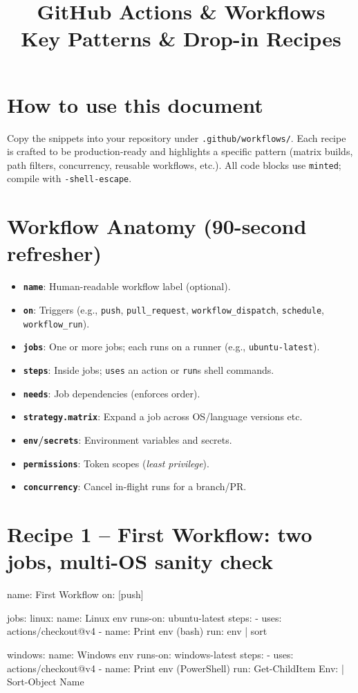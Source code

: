 \documentclass[11pt]{article}
\title{\textbf{GitHub Actions \& Workflows}\\Key Patterns \& Drop-in Recipes}
\author{}
\date{}
\begin{document}
\maketitle

\section*{How to use this document}
Copy the snippets into your repository under \texttt{.github/workflows/}. Each recipe is crafted to be production-ready and highlights a specific pattern (matrix builds, path filters, concurrency, reusable workflows, etc.). All code blocks use \texttt{minted}; compile with \texttt{-shell-escape}.

\section{Workflow Anatomy (90-second refresher)}
\begin{itemize}
  \item \textbf{\texttt{name}}: Human-readable workflow label (optional).
  \item \textbf{\texttt{on}}: Triggers (e.g., \texttt{push}, \texttt{pull\_request}, \texttt{workflow\_dispatch}, \texttt{schedule}, \texttt{workflow\_run}).
  \item \textbf{\texttt{jobs}}: One or more jobs; each runs on a runner (e.g., \texttt{ubuntu-latest}).
  \item \textbf{\texttt{steps}}: Inside jobs; \texttt{uses} an action or \texttt{run}s shell commands.
  \item \textbf{\texttt{needs}}: Job dependencies (enforces order).
  \item \textbf{\texttt{strategy.matrix}}: Expand a job across OS/language versions etc.
  \item \textbf{\texttt{env}/\texttt{secrets}}: Environment variables and secrets.
  \item \textbf{\texttt{permissions}}: Token scopes (\emph{least privilege}).
  \item \textbf{\texttt{concurrency}}: Cancel in-flight runs for a branch/PR.
\end{itemize}

\newpage
\section{Recipe 1 – First Workflow: two jobs, multi-OS sanity check}
\begin{listing}[H]
\caption{Basic two-job workflow to verify runners, shells, and checkout}
\begin{yamlcode}
name: First Workflow
on: [push]

jobs:
  linux:
    name: Linux env
    runs-on: ubuntu-latest
    steps:
      - uses: actions/checkout@v4
      - name: Print env (bash)
        run: env | sort

  windows:
    name: Windows env
    runs-on: windows-latest
    steps:
      - uses: actions/checkout@v4
      - name: Print env (PowerShell)
        run: Get-ChildItem Env: | Sort-Object Name
\end{yamlcode}
\end{listing}
\end{document}
